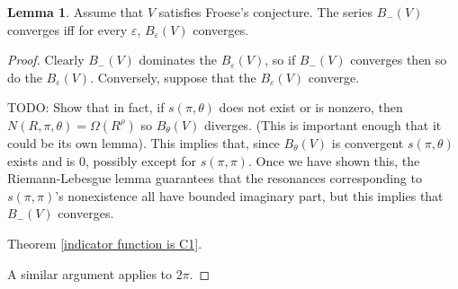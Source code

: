 \documentclass[12pt]{report}
\theoremstyle{definition}
\newtheorem{lemma}[theorem]{Lemma}
\begin{document}
\begin{lemma}
\label{epsilon absolute converge in lower half plane}
Assume that $V$ satisfies Froese's conjecture. The series $B_-(V)$ converges iff for every $\varepsilon$, $B_\varepsilon(V)$ converges.
\end{lemma}
\begin{proof}
Clearly $B_-(V)$ dominates the $B_\varepsilon(V)$, so if $B_-(V)$ converges then so do the $B_\varepsilon(V)$. Conversely, suppose that the $B_\varepsilon(V)$ converge.

TODO: Show that in fact, if $s(\pi, \theta)$ does not exist or is nonzero, then $N(R, \pi, \theta) = \Omega(R^\rho)$ so $B_\theta(V)$ diverges. (This is important enough that it could be its own lemma).
This implies that, since $B_\theta(V)$ is convergent $s(\pi, \theta)$ exists and is $0$, possibly except for $s(\pi, \pi)$. Once we have shown this, the Riemann-Lebesgue lemma guarantees that the resonances corresponding to $s(\pi, \pi)$'s nonexistence all have bounded imaginary part, but this implies that $B_-(V)$ converges.

 Theorem \ref{indicator function is C1}.

A similar argument applies to $2\pi$.
\end{proof}
\end{document}
